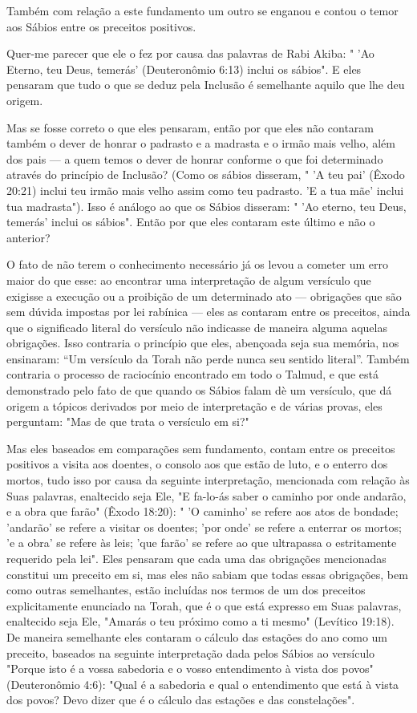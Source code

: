 Também com relação a este fundamento um outro se enganou e con­tou o
temor aos Sábios entre os preceitos positivos.

Quer-me parecer que ele o fez por causa das palavras de Rabi Akiba: "
'Ao Eterno, teu Deus, temerás' (Deuteronômio 6:13) inclui os sábios". E
eles pensaram que tudo o que se deduz pela Inclusão é semelhante aquilo
que lhe deu origem.

Mas se fosse correto o que eles pensaram, então por que eles não
contaram também o dever de honrar o padrasto e a madrasta e o irmão mais
velho, além dos pais --- a quem temos o dever de honrar conforme o que
foi determinado através do princípio de Inclusão? (Como os sábios
disseram, " 'A teu pai' (Êxodo 20:21) inclui teu irmão mais velho assim
como teu padrasto. 'E a tua mãe' inclui tua madrasta"). Isso é análogo
ao que os Sábios disseram: " 'Ao eterno, teu Deus, temerás' inclui os
sábios". Então por que eles conta­ram este último e não o anterior?

O fato de não terem o conhecimento necessário já os levou a come­ter um
erro maior do que esse: ao encontrar uma interpretação de algum
versí­culo que exigisse a execução ou a proibição de um determinado ato
--- obriga­ções que são sem dúvida impostas por lei rabínica --- eles as
contaram entre os preceitos, ainda que o significado literal do
versículo não indicasse de ma­neira alguma aquelas obrigações. Isso
contraria o princípio que eles, abençoa­da seja sua memória, nos
ensinaram: ``Um versículo da Torah não perde nunca seu sentido literal''.
Também contraria o processo de raciocínio encontrado em todo o Talmud, e
que está demonstrado pelo fato de que quando os Sábios falam dè um
versículo, que dá origem a tópicos derivados por meio de inter­pretação
e de várias provas, eles perguntam: "Mas de que trata o versículo em
si?"

Mas eles baseados em comparações sem fundamento, contam entre os
preceitos positivos a visita aos doentes, o consolo aos que estão de
luto, e o enterro dos mortos, tudo isso por causa da seguinte
interpretação, mencio­nada com relação às Suas palavras, enaltecido seja
Ele, "E fa-lo-ás saber o cami­nho por onde andarão, e a obra que farão"
(Êxodo 18:20): " 'O caminho' se refere aos atos de bondade; 'andarão' se
refere a visitar os doentes; 'por onde' se refere a enterrar os mortos;
'e a obra' se refere às leis; 'que farão' se refere ao que ultrapassa o
estritamente requerido pela lei". Eles pensaram que cada uma das
obrigações mencionadas constitui um preceito em si, mas eles não sa­biam
que todas essas obrigações, bem como outras semelhantes, estão
incluí­das nos termos de um dos preceitos explicitamente enunciado na
Torah, que é o que está expresso em Suas palavras, enaltecido seja Ele,
"Amarás o teu pró­ximo como a ti mesmo" (Levítico 19:18). De maneira
semelhante eles conta­ram o cálculo das estações do ano como um
preceito, baseados na seguinte in­terpretação dada pelos Sábios ao
versículo "Porque isto é a vossa sabedoria e o vosso entendimento à
vista dos povos" (Deuteronômio 4:6): "Qual é a sabe­doria e qual o
entendimento que está à vista dos povos? Devo dizer que é o cálculo das
estações e das constelações".


